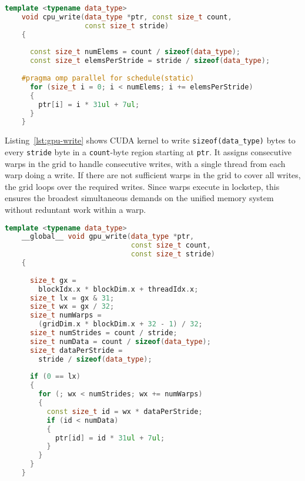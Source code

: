 \begin{lstlisting}[language=c++, caption=CPU Write Function, label=lst:cpu-write]
    template <typename data_type>
    void cpu_write(data_type *ptr, const size_t count,
                   const size_t stride)
    {
    
      const size_t numElems = count / sizeof(data_type);
      const size_t elemsPerStride = stride / sizeof(data_type);
    
    #pragma omp parallel for schedule(static)
      for (size_t i = 0; i < numElems; i += elemsPerStride)
      {
        ptr[i] = i * 31ul + 7ul;
      }
    }
\end{lstlisting}

Listing~\ref{lst:gpu-write} shows CUDA kernel to write \texttt{sizeof(data\_type)} bytes to every \texttt{stride} byte in a \texttt{count}-byte region starting at \texttt{ptr}.
It assigns consecutive warps in the grid to handle consecutive writes, with a single thread from each warp doing a write.
If there are not sufficient warps in the grid to cover all writes, the grid loops over the required writes.
Since warps execute in lockstep, this ensures the broadest simultaneous demands on the unified memory system without reduntant work within a warp.

\begin{lstlisting}[language=c++, caption=GPU Write Function, label=lst:cpu-write]
    template <typename data_type>
    __global__ void gpu_write(data_type *ptr,
                              const size_t count,
                              const size_t stride)
    {
    
      size_t gx = 
        blockIdx.x * blockDim.x + threadIdx.x;
      size_t lx = gx & 31;
      size_t wx = gx / 32;
      size_t numWarps = 
        (gridDim.x * blockDim.x + 32 - 1) / 32;
      size_t numStrides = count / stride;
      size_t numData = count / sizeof(data_type);
      size_t dataPerStride = 
        stride / sizeof(data_type);
    
      if (0 == lx)
      {
        for (; wx < numStrides; wx += numWarps)
        {
          const size_t id = wx * dataPerStride;
          if (id < numData)
          {
            ptr[id] = id * 31ul + 7ul;
          }
        }
      }
    }
\end{lstlisting}

